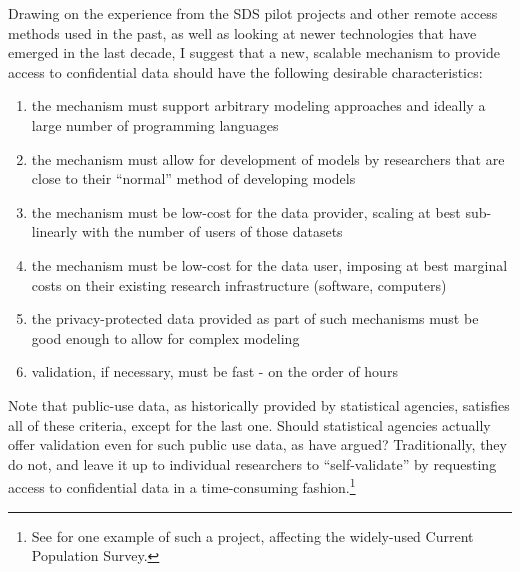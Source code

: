 \documentclass{article}
\begin{document}
Drawing on the experience from the SDS pilot projects and other remote access methods used in the past, as well as looking at newer technologies that have emerged in the last decade, I suggest that a new, scalable mechanism to provide access to confidential data should have the following desirable characteristics:

\begin{enumerate}
    \item the mechanism must support arbitrary modeling approaches and ideally a large number of programming languages
    \item the mechanism must allow for development of models by researchers that are close to their ``normal'' method of developing models
    \item the mechanism must be low-cost for the data provider, scaling at best sub-linearly with the number of users of those datasets
    \item the mechanism must be low-cost for the data user, imposing at best marginal costs on their existing research infrastructure (software, computers)
    \item the privacy-protected data provided as part of such mechanisms must be good enough to allow for complex modeling
    \item validation, if necessary, must be fast - on the order of hours
\end{enumerate}

Note that public-use data, as historically provided by statistical agencies, satisfies all of these criteria, except for the last one. Should statistical agencies actually offer validation even for such public use data, as \citet{reiter_verification_2009} have argued? Traditionally, they do not, and leave it up to individual researchers to ``self-validate'' by requesting access to confidential data in a time-consuming fashion.\footnote{See \cite{armour_using_2016} for one example of such a project, affecting the widely-used Current Population Survey.}
\end{document}
